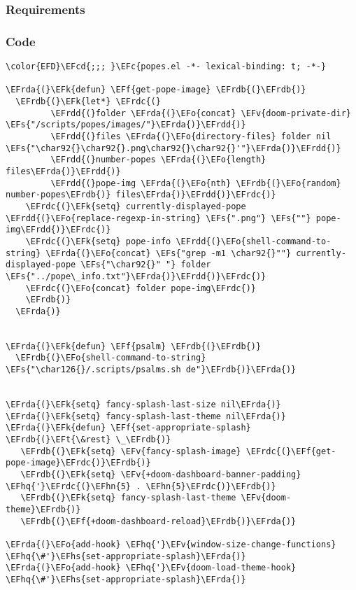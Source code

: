 \documentclass[a4wide,10pt]{article}
\newcommand{\EFc}[1]{\textcolor{EFc}{#1}} %
\newcommand{\EFcd}[1]{\textcolor{EFcd}{#1}} %
\newcommand{\EFs}[1]{\textcolor{EFs}{#1}} %
\newcommand{\EFk}[1]{\textcolor{EFk}{#1}} %
\newcommand{\EFf}[1]{\textcolor{EFf}{#1}} %
\newcommand{\EFv}[1]{\textcolor{EFv}{#1}} %
\newcommand{\EFt}[1]{\textcolor{EFt}{#1}} %
\newcommand{\EFo}[1]{\textcolor{EFo}{#1}} %
\newcommand{\EFhn}[1]{\textcolor{EFhn}{\textbf{#1}}} %
\newcommand{\EFhq}[1]{\textcolor{EFhq}{#1}} %
\newcommand{\EFhs}[1]{\textcolor{EFhs}{#1}} %
\newcommand{\EFrda}[1]{\textcolor{EFrda}{#1}} %
\newcommand{\EFrdb}[1]{\textcolor{EFrdb}{#1}} %
\newcommand{\EFrdc}[1]{\textcolor{EFrdc}{#1}} %
\newcommand{\EFrdd}[1]{\textcolor{EFrdd}{#1}} %
\begin{document}
\subsubsection{Requirements}
\label{sec:org2761001}
\subsubsection{Code}
\label{sec:org719f443}
\begin{Code}
\begin{Verbatim}
\color{EFD}\EFcd{;;; }\EFc{popes.el -*- lexical-binding: t; -*-}

\EFrda{(}\EFk{defun} \EFf{get-pope-image} \EFrdb{(}\EFrdb{)}
  \EFrdb{(}\EFk{let*} \EFrdc{(}
         \EFrdd{(}folder \EFrda{(}\EFo{concat} \EFv{doom-private-dir} \EFs{"/scripts/popes/images/"}\EFrda{)}\EFrdd{)}
         \EFrdd{(}files \EFrda{(}\EFo{directory-files} folder nil \EFs{"\char92{}\char92{}.png\char92{}\char92{}'"}\EFrda{)}\EFrdd{)}
         \EFrdd{(}number-popes \EFrda{(}\EFo{length} files\EFrda{)}\EFrdd{)}
         \EFrdd{(}pope-img \EFrda{(}\EFo{nth} \EFrdb{(}\EFo{random} number-popes\EFrdb{)} files\EFrda{)}\EFrdd{)}\EFrdc{)}
    \EFrdc{(}\EFk{setq} currently-displayed-pope \EFrdd{(}\EFo{replace-regexp-in-string} \EFs{".png"} \EFs{""} pope-img\EFrdd{)}\EFrdc{)}
    \EFrdc{(}\EFk{setq} pope-info \EFrdd{(}\EFo{shell-command-to-string} \EFrda{(}\EFo{concat} \EFs{"grep -m1 \char92{}""} currently-displayed-pope \EFs{"\char92{}" "} folder \EFs{"../pope\_info.txt"}\EFrda{)}\EFrdd{)}\EFrdc{)}
    \EFrdc{(}\EFo{concat} folder pope-img\EFrdc{)}
    \EFrdb{)}
  \EFrda{)}


\EFrda{(}\EFk{defun} \EFf{psalm} \EFrdb{(}\EFrdb{)}
  \EFrdb{(}\EFo{shell-command-to-string} \EFs{"\char126{}/.scripts/psalms.sh de"}\EFrdb{)}\EFrda{)}


\EFrda{(}\EFk{setq} fancy-splash-last-size nil\EFrda{)}
\EFrda{(}\EFk{setq} fancy-splash-last-theme nil\EFrda{)}
\EFrda{(}\EFk{defun} \EFf{set-appropriate-splash} \EFrdb{(}\EFt{\&rest} \_\EFrdb{)}
   \EFrdb{(}\EFk{setq} \EFv{fancy-splash-image} \EFrdc{(}\EFf{get-pope-image}\EFrdc{)}\EFrdb{)}
   \EFrdb{(}\EFk{setq} \EFv{+doom-dashboard-banner-padding} \EFhq{'}\EFrdc{(}\EFhn{5} . \EFhn{5}\EFrdc{)}\EFrdb{)}
   \EFrdb{(}\EFk{setq} fancy-splash-last-theme \EFv{doom-theme}\EFrdb{)}
   \EFrdb{(}\EFf{+doom-dashboard-reload}\EFrdb{)}\EFrda{)}

\EFrda{(}\EFo{add-hook} \EFhq{'}\EFv{window-size-change-functions} \EFhq{\#'}\EFhs{set-appropriate-splash}\EFrda{)}
\EFrda{(}\EFo{add-hook} \EFhq{'}\EFv{doom-load-theme-hook} \EFhq{\#'}\EFhs{set-appropriate-splash}\EFrda{)}


\end{Verbatim}
\end{Code}
\end{document}
